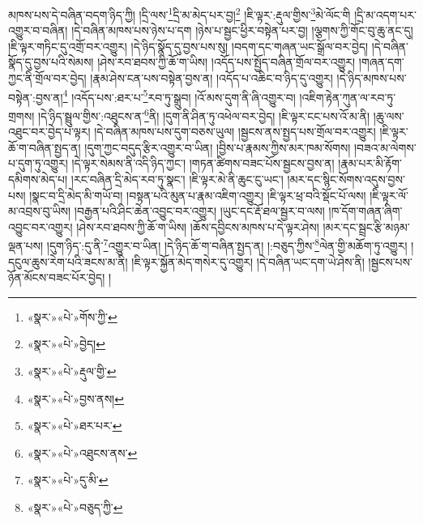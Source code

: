 མཁས་པས་དེ་བཞིན་བདག་ཉིད་ཀྱི། །དྲི་ལས་\footnote{«སྣར་»«པེ་»གོས་ཀྱི་}དྲི་མ་མེད་པར་བྱ།\footnote{«སྣར་»«པེ་»བྱེད།} །ཇི་ལྟར་:རྡུལ་གྱིས་\footnote{«སྣར་»«པེ་»རྡུལ་གྱི་}མེ་ལོང་གི །དྲི་མ་འདག་པར་འགྱུར་བ་བཞིན། །དེ་བཞིན་མཁས་པས་ཉེས་པ་དག །ཉེས་པ་སྦྱང་ཕྱིར་བསྟེན་པར་བྱ། །ལྕགས་ཀྱི་གོང་བུ་ཆུ་ནང་དུ། །ཇི་ལྟར་གཏིང་དུ་འགྲོ་བར་འགྱུར། །དེ་ཉིད་སྣོད་དུ་བྱས་པས་སུ། །བདག་དང་གཞན་ཡང་སྒྲོལ་བར་བྱེད། །དེ་བཞིན་སྣོད་དུ་བྱས་པའི་སེམས། །ཤེས་རབ་ཐབས་ཀྱི་ཆོ་ག་ཡིས། །འདོད་པས་སྤྱོད་བཞིན་གྲོལ་བར་འགྱུར། །གཞན་དག་ཀྱང་ནི་གྲོལ་བར་བྱེད། །རྣམ་ཤེས་ངན་པས་བསྟེན་བྱས་ན། །འདོད་པ་འཆིང་བ་ཉིད་དུ་འགྱུར། །དེ་ཉིད་མཁས་པས་བསྟེན་:བྱས་ན།\footnote{«སྣར་»«པེ་»བྱས་ནས།} །འདོད་པས་:ཐར་པ་\footnote{«སྣར་»«པེ་»ཐར་པར་}རབ་ཏུ་སྒྲུབ། །འོ་མས་དུག་ནི་ཞི་འགྱུར་བ། །འཇིག་རྟེན་ཀུན་ལ་རབ་ཏུ་གྲགས། །དེ་ཉིད་སྦྲུལ་གྱིས་:འཐུངས་ན་\footnote{«སྣར་»«པེ་»འཐུངས་ནས་}ནི། །དུག་ནི་ཤིན་ཏུ་འཕེལ་བར་བྱེད། །ཇི་ལྟར་ངང་པས་འོ་མ་ནི། །ཆུ་ལས་འཐུང་བར་བྱེད་པ་ལྟར། །དེ་བཞིན་མཁས་པས་དུག་བཅས་ཡུལ། །སྦྱངས་ནས་སྤྱད་པས་གྲོལ་བར་འགྱུར། །ཇི་ལྟར་ཆོ་ག་བཞིན་སྤྱད་ན། །དུག་ཀྱང་བདུད་རྩིར་འགྱུར་བ་ཡིན། །བྱིས་པ་རྣམས་ཀྱིས་མར་ཁམ་སོགས། །བཟའ་མ་ལེགས་པ་དུག་ཏུ་འགྱུར། །དེ་ལྟར་སེམས་ནི་འདི་ཉིད་ཀྱང་། །གཏན་ཚིགས་བཟང་པོས་སྦྱངས་བྱས་ན། །རྣམ་པར་མི་རྟོག་དམིགས་མེད་པ། །རང་བཞིན་དྲི་མེད་རབ་ཏུ་སྣང་། །ཇི་ལྟར་མེ་ནི་ཆུང་ངུ་ཡང་། །མར་དང་སྙིང་སོགས་འདུས་བྱས་པས། །སྣང་བ་དྲི་མེད་མི་གཡོ་བ། །བསྟན་པའི་མུན་པ་རྣམ་འཇིག་འགྱུར། །ཇི་ལྟར་ཕྲ་བའི་སྡོང་པོ་ལས། །ཇི་ལྟར་ལོ་མ་འབྲས་བུ་ཡིས། །བརྒྱན་པའི་ཤིང་ཆེན་འབྱུང་བར་འགྱུར། །ཡུང་དང་རྡོ་ཐལ་སྦྱར་བ་ལས། །ཁ་དོག་གཞན་ཞིག་འབྱུང་བར་འགྱུར། །ཤེས་རབ་ཐབས་ཀྱི་ཆོ་ག་ཡིས། །ཆོས་དབྱིངས་མཁས་པ་དེ་ལྟར་ཤེས། །མར་དང་སྦྲང་རྩི་མཉམ་ལྡན་པས། །དུག་ཉིད་:དུ་ནི་\footnote{«སྣར་»«པེ་»དུ་མི་}འགྱུར་བ་ཡིན། །དེ་ཉིད་ཆོ་ག་བཞིན་སྤྱད་ན། །:བཅུད་ཀྱིས་\footnote{«སྣར་»«པེ་»བཅུད་ཀྱི་}ལེན་གྱི་མཆོག་ཏུ་འགྱུར། །དངུལ་ཆུས་རེག་པའི་ཟངས་མ་ནི། །ཇི་ལྟར་སྐྱོན་མེད་གསེར་དུ་འགྱུར། །དེ་བཞིན་ཡང་དག་ཡེ་ཤེས་ནི། །སྦྱངས་པས་ཉོན་མོངས་བཟང་པོར་བྱེད། །
